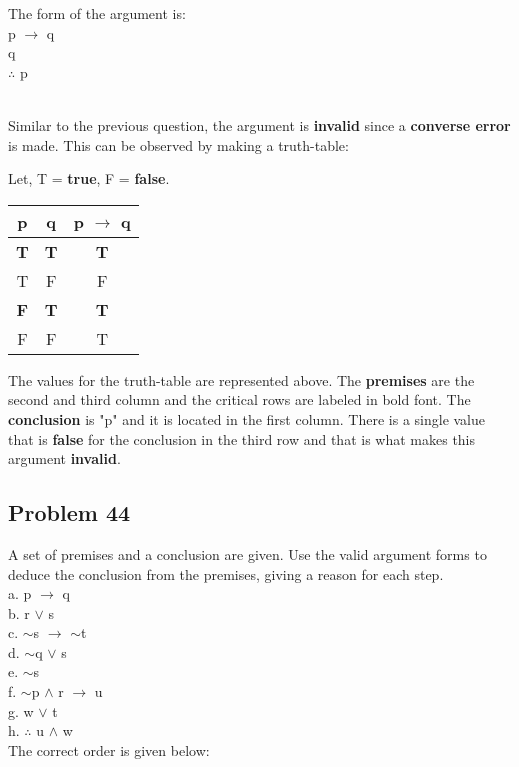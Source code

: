 \documentclass{article}
\begin{document}
The form of the argument is:
\\ p $\rightarrow$ q
\\ q
\\ $\therefore$ p

\\ Similar to the previous question, the argument is \textbf{invalid} since a \textbf{converse error} is made. This can be observed by making a truth-table:

Let, T = \textbf{true}, F = \textbf{false}.
\begin{center}
	\begin{tabular}{ |c|c|c| } 
		\hline
		p & q & p $\rightarrow$ q \\ 
		\hline
		\textbf{T} & \textbf{T} & \textbf{T} \\ 
		T & F & F \\ 
		\textbf{F} & \textbf{T} & \textbf{T} \\ 
		F & F & T \\ 
		\hline
	\end{tabular}
\end{center}

The values for the truth-table are represented above. The \textbf{premises} are the second and third column and the critical rows are labeled in bold font. The \textbf{conclusion} is "p" and it is located in the first column. There is a single value that is \textbf{false} for the conclusion in the third row and that is what makes this argument \textbf{invalid}.

\subsection*{Problem 44}
A set of premises and a conclusion are given. Use the valid argument forms to deduce the conclusion from the premises, giving a reason for each step. 
\\ a. p $\rightarrow$ q
\\ b. r $\vee$ s
\\ c. $\sim$s $\rightarrow$ $\sim$t
\\ d. $\sim$q $\vee$ s
\\ e. $\sim$s
\\ f. $\sim$p $\wedge$ r $\rightarrow$ u
\\ g. w $\vee$ t
\\ h. $\therefore$ u $\wedge$ w
\\ The correct order is given below:
\end{document}
